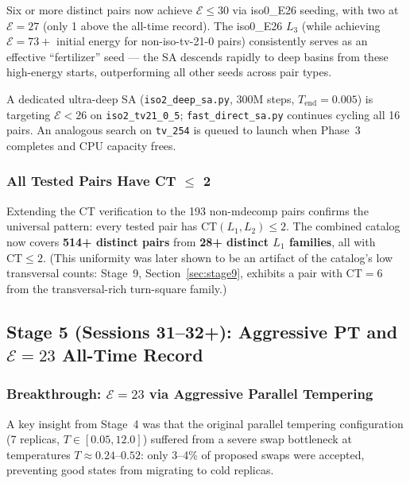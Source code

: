 \documentclass[11pt,a4paper]{article}
\theoremstyle{remark}
\newcommand{\CT}{\mathrm{CT}}
\newcommand{\E}{\mathcal{E}}
\begin{document}
Six or more distinct pairs now achieve $\E \leq 30$ via iso0\_E26 seeding, with two at
$\E=27$ (only 1 above the all-time record). The iso0\_E26 $L_3$ (while achieving
$\E=73{+}$ initial energy for non-iso-tv-21-0 pairs) consistently serves as an
effective ``fertilizer'' seed --- the SA descends rapidly to deep basins from
these high-energy starts, outperforming all other seeds across pair types.

A dedicated ultra-deep SA (\texttt{iso2\_deep\_sa.py}, 300M steps, $T_\text{end}=0.005$)
is targeting $\E < 26$ on \texttt{iso2\_tv21\_0\_5}; \texttt{fast\_direct\_sa.py}
continues cycling all 16 pairs. An analogous search on \texttt{tv\_254} is queued to
launch when Phase~3 completes and CPU capacity frees.

\subsubsection{All Tested Pairs Have CT $\leq$ 2}

Extending the CT verification to the 193 non-mdecomp pairs confirms the universal
pattern: every tested pair has $\CT(L_1, L_2) \leq 2$. The combined catalog now covers
\textbf{514+ distinct pairs} from \textbf{28+ distinct $L_1$ families}, all with
$\CT \leq 2$. (This uniformity was later shown to be an artifact of the catalog's
low transversal counts: Stage~9, Section~\ref{sec:stage9}, exhibits a pair with
$\CT = 6$ from the transversal-rich turn-square family.)

\subsection{Stage 5 (Sessions 31--32+): Aggressive PT and $\E=23$ All-Time Record}
\label{sec:stage5}

\subsubsection{Breakthrough: $\E=23$ via Aggressive Parallel Tempering}

A key insight from Stage~4 was that the original parallel tempering configuration
(7 replicas, $T \in [0.05, 12.0]$) suffered from a severe swap bottleneck at
temperatures $T \approx 0.24$--$0.52$: only 3--4\% of proposed swaps were accepted,
preventing good states from migrating to cold replicas.
\end{document}
